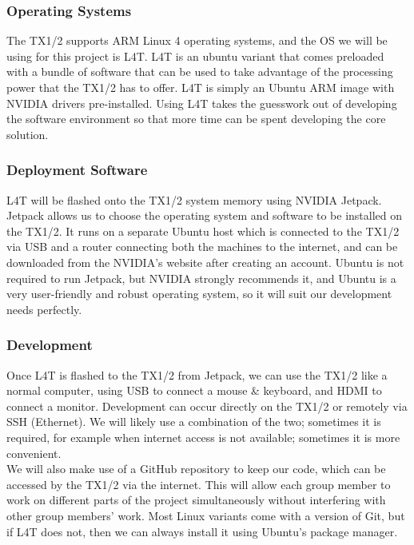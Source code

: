 \documentclass[letterpaper,10pt,serif,draftclsnofoot,onecolumn,compsoc,titlepage]{IEEEtran}
\begin{document}
\subsubsection{Operating Systems}

The TX1/2 supports ARM Linux 4 operating systems, and the OS we will be using for this 
project is L4T. L4T is an ubuntu variant that comes preloaded with a 
bundle of software that can be used to take advantage of the processing power that 
the TX1/2 has to offer. L4T is simply an Ubuntu ARM image with NVIDIA drivers 
pre-installed. Using L4T takes the guesswork out of developing the software 
environment so that more time can be spent developing the core solution. \\

\subsubsection{Deployment Software}

L4T will be flashed onto the TX1/2 system memory using NVIDIA Jetpack. Jetpack allows 
us to choose the operating system and software to be installed on the TX1/2. It runs on 
a separate Ubuntu host which is connected to the TX1/2 via USB and a router connecting 
both the machines to the internet, and can be downloaded from the NVIDIA's website 
after creating an account. Ubuntu is not required to run Jetpack, but NVIDIA strongly 
recommends it, and Ubuntu is a very user-friendly and robust operating system, so it 
will suit our development needs perfectly. \\

\subsubsection{Development}

Once L4T is flashed to the TX1/2 from Jetpack, we can use the TX1/2 like a normal 
computer, using USB to connect a mouse \& keyboard, and HDMI to connect a monitor. 
Development can occur directly on the TX1/2 or remotely via SSH (Ethernet). We will 
likely use a combination of the two; sometimes it is required, for example when 
internet access is not available; sometimes it is more convenient. \\

We will also make use of a GitHub repository to keep our code, which can be accessed 
by the TX1/2 via the internet. This will allow each group member to work on different 
parts of the project simultaneously without interfering with other group members' 
work. Most Linux variants come with a version of Git, but if L4T does not, then we 
can always install it using Ubuntu's package manager. \\
\end{document}
